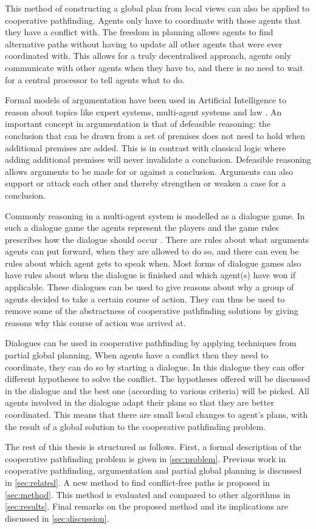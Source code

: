 This method of constructing a global plan from local views can also be applied
to cooperative pathfinding. Agents only have to coordinate with those agents
that they have a conflict with. The freedom in planning allows agents to find
alternative paths without having to update all other agents that were ever
coordinated with. This allows for a truly decentralised approach,
agents only communicate with other agents when they have to, and there is no
need to wait for a central processor to tell agents what to do.

Formal models of argumentation have been used in Artificial Intelligence to
reason about topics like expert systems, multi-agent systems and law
\cite{vaneemeren2014}.
An important concept in argumentation is that of defeasible reasoning: the
conclusion that can be drawn from a set of premises does not need to hold when
additional premises are added. This is in contrast with classical logic where
adding additional premises will never invalidate a conclusion. Defeasible
reasoning allows arguments to be made for or against a conclusion. Arguments
can also support or attack each other and thereby strengthen or weaken a
case for a conclusion.

Commonly reasoning in a multi-agent system is modelled as a dialogue game. In
such a dialogue game the agents represent the players and the game rules
prescribes how the dialogue should occur \cite{walton1995}. There are rules
about what
arguments agents can put forward, when they are allowed to do so, and there can
even be rules about which agent gets to speak when. Most forms of dialogue
games also have rules about when the dialogue is finished and which agent(s)
have won if applicable. These dialogues can be used to give reasons about why a
group of agents decided to take a certain course of action. They can thus be
used to remove some of the abstractness of cooperative pathfinding solutions by
giving reasons why this course of action was arrived at.

Dialogues can be used in cooperative pathfinding by applying techniques from
partial global planning. When agents have a conflict then they need to
coordinate, they can do so by starting a dialogue. In this dialogue they can
offer different hypotheses to solve the conflict. The hypotheses offered will
be discussed in the dialogue and the best one (according to various criteria)
will be picked. All agents involved in the dialogue adapt their plans so that
they are better coordinated. This means that there are small local changes to
agent's plans, with the result of a global solution to the cooperative
pathfinding problem.

The rest of this thesis is structured as follows. First, a formal description
of the cooperative pathfinding problem is given in \autoref{sec:problem}.
Previous work in cooperative pathfinding, argumentation and partial global
planning is discussed in \autoref{sec:related}. A new method to find
conflict-free paths is proposed in \autoref{sec:method}. This method is
evaluated and compared to other algorithms in \autoref{sec:results}. Final
remarks on the proposed method and its implications are discussed in
\autoref{sec:discussion}.
